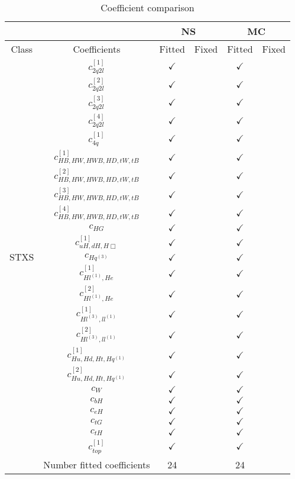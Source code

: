 \documentclass{article}
\begin{document}
\begin{table}[H]
\centering
\begin{tabular}{|c|c|c|c|c|c|}
\hline
 &  & \multicolumn{2}{c|}{NS}  & \multicolumn{2}{c|}{MC}  \\ \hline
Class & Coefficients & Fitted & Fixed  & Fitted & Fixed  \\ \hline
\multirow{24}{*}{STXS}
 & $c_{2q2l}^{[1]}$ & $\checkmark$ &  & $\checkmark$ & \\ \cline{2-6}
 & $c_{2q2l}^{[2]}$ & $\checkmark$ &  & $\checkmark$ & \\ \cline{2-6}
 & $c_{2q2l}^{[3]}$ & $\checkmark$ &  & $\checkmark$ & \\ \cline{2-6}
 & $c_{2q2l}^{[4]}$ & $\checkmark$ &  & $\checkmark$ & \\ \cline{2-6}
 & $c_{4q}^{[1]}$ & $\checkmark$ &  & $\checkmark$ & \\ \cline{2-6}
 & $c_{HB,HW,HWB,HD,tW,tB}^{[1]}$ & $\checkmark$ &  & $\checkmark$ & \\ \cline{2-6}
 & $c_{HB,HW,HWB,HD,tW,tB}^{[2]}$ & $\checkmark$ &  & $\checkmark$ & \\ \cline{2-6}
 & $c_{HB,HW,HWB,HD,tW,tB}^{[3]}$ & $\checkmark$ &  & $\checkmark$ & \\ \cline{2-6}
 & $c_{HB,HW,HWB,HD,tW,tB}^{[4]}$ & $\checkmark$ &  & $\checkmark$ & \\ \cline{2-6}
 & $c_{HG}$ & $\checkmark$ &  & $\checkmark$ & \\ \cline{2-6}
 & $c_{uH,dH,H\Box}^{[1]}$ & $\checkmark$ &  & $\checkmark$ & \\ \cline{2-6}
 & $c_{Hq^(3)}$ & $\checkmark$ &  & $\checkmark$ & \\ \cline{2-6}
 & $c_{Hl^{(1)},He}^{[1]}$ & $\checkmark$ &  & $\checkmark$ & \\ \cline{2-6}
 & $c_{Hl^{(1)},He}^{[2]}$ & $\checkmark$ &  & $\checkmark$ & \\ \cline{2-6}
 & $c_{Hl^{(3)},ll^{(1)}}^{[1]}$ & $\checkmark$ &  & $\checkmark$ & \\ \cline{2-6}
 & $c_{Hl^{(3)},ll^{(1)}}^{[2]}$ & $\checkmark$ &  & $\checkmark$ & \\ \cline{2-6}
 & $c_{Hu,Hd,Ht,Hq^{(1)}}^{[1]}$ & $\checkmark$ &  & $\checkmark$ & \\ \cline{2-6}
 & $c_{Hu,Hd,Ht,Hq^{(1)}}^{[2]}$ & $\checkmark$ &  & $\checkmark$ & \\ \cline{2-6}
 & $c_{W}$ & $\checkmark$ &  & $\checkmark$ & \\ \cline{2-6}
 & $c_{bH}$ & $\checkmark$ &  & $\checkmark$ & \\ \cline{2-6}
 & $c_{eH}$ & $\checkmark$ &  & $\checkmark$ & \\ \cline{2-6}
 & $c_{tG}$ & $\checkmark$ &  & $\checkmark$ & \\ \cline{2-6}
 & $c_{tH}$ & $\checkmark$ &  & $\checkmark$ & \\ \cline{2-6}
 & $c_{top}^{[1]}$ & $\checkmark$ &  & $\checkmark$ & 
\\ \hline
\hline & Number fitted coefficients & 24 &  & 24 &  \\ \hline
\end{tabular}
\caption{Coefficient comparison}
\end{table}
\end{document}
